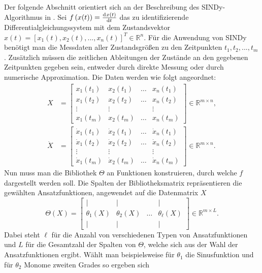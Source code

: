 Der folgende Abschnitt orientiert sich an der Beschreibung des SINDy-Algorithmus in \cite{Brunton2016}. 
Sei $f\left(x(t)\right) = \frac{\mathrm{d}^{}x(t)}{\mathrm{d}{t}^{}}$ das zu identifizierende Differentialgleichungssystem mit dem Zustandsvektor $x(t) = [x_1(t), x_2(t), ... , x_n(t)]^T \in\mathbb{R}^n$.
Für die Anwendung von SINDy benötigt man die Messdaten aller Zustandsgrößen zu den Zeitpunkten $t_1, t_2, ..., t_m$. Zusätzlich müssen die zeitlichen Ableitungen der Zustände an den gegebenen Zeitpunkten gegeben sein, entweder durch direkte Messung oder durch numerische Approximation. Die Daten werden wie folgt angeordnet: 
\begin{align}
X &= \begin{bmatrix}
		x_1(t_1) & x_2(t_1) & \dots & x_n(t_1) \\
		x_1(t_2) & x_2(t_2) & \dots & x_n(t_2) \\
		\vdots   & \vdots   & 		& \vdots \\ 
		x_1(t_m) & x_2(t_m) & \dots & x_n(t_m)
	\end{bmatrix} \in \mathbb{R}^{m\times n},
	\\
	\dot{X} &= \begin{bmatrix} 
		\dot{x}_1(t_1) & \dot{x}_2(t_1) & \dots & \dot{x}_n(t_1) \\
		\dot{x}_1(t_2) & \dot{x}_2(t_2) & \dots & \dot{x}_n(t_2) \\
		\vdots 		   & \vdots 		& 		& \vdots \\
		\dot{x}_1(t_m) & \dot{x}_2(t_m) & \dots & \dot{x}_n(t_m)
	\end{bmatrix}  \in \mathbb{R}^{m\times n}.
\end{align}
Nun muss man die Bibliothek $\Theta$ an Funktionen konstruieren, durch welche $f$ dargestellt werden soll. 
Die Spalten der Bibliotheksmatrix repräsentieren die gewählten Ansatzfunktionen, angewendet auf die Datenmatrix $X$
\begin{equation}
\Theta(X) = \begin{bmatrix}
		\mid & \mid & & \mid \\
		\theta_1(X) & \theta_2(X) & \dots & \theta_\ell(X) \\
		\mid & \mid & & \mid 
	\end{bmatrix}\in\mathbb{R}^{m\times L}.
\end{equation} 
Dabei steht $\ell$ für die Anzahl von verschiedenen Typen von Ansatzfunktionen und $L$ für die Gesamtzahl der Spalten von $\Theta$, welche sich aus der Wahl der Ansatzfunktionen ergibt. Wählt man beispielsweise für $\theta_1$ die Sinusfunktion und für $\theta_2$ Monome zweiten Grades so ergeben sich 
